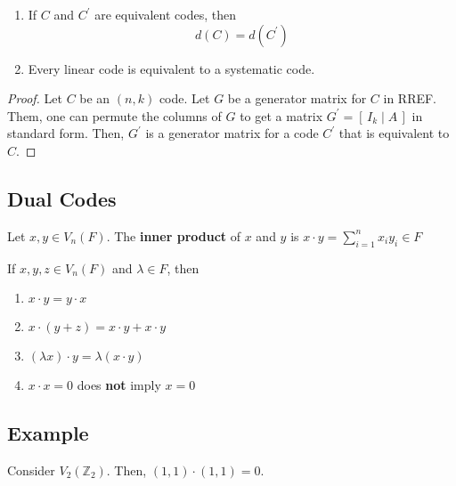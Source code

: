 \begin{thmbox}
    \begin{theorem}
    \begin{enumerate}[(1)]
        \item If $ C $ and $ C^{\prime} $ are equivalent codes, then
        \[ d(C)=d(C^{\prime}) \]
        \item Every linear code is equivalent to a systematic code.
    \end{enumerate}
\end{theorem} \end{thmbox}

\begin{proof}
    Let $ C $ be an $ (n,k) $ code. Let $ G $ be a generator matrix for $ C $
    in RREF. Them, one can permute the columns of $ G $ to get a matrix
    $ G^{\prime}=\left[ \,I_k\mid A\, \right] $ in standard form. Then,
    $ G^{\prime} $ is a generator matrix for a code $ C^{\prime} $ that is
    equivalent to $ C $.
\end{proof}

\subsection{Dual Codes}
\begin{defbox}
    \begin{definition}
    Let $ x,y\in V_n(F) $. The \textbf{inner product} of $ x $ and $ y $
    is $ x\cdot y=\sum\limits_{i=1}^{n} x_iy_i\in F $
\end{definition} \end{defbox}

\begin{thmbox}
    \begin{theorem}
    If $ x,y,z\in V_n(F) $ and $ \lambda\in F $, then
    \begin{enumerate}[(1)]
        \item $ x\cdot y=y\cdot x $
        \item $ x\cdot (y+z)=x\cdot y+x\cdot y $
        \item $ (\lambda x)\cdot y=\lambda(x\cdot y) $
        \item $ x\cdot x=0$ does \textbf{not} imply $ x=0 $
    \end{enumerate}
\end{theorem} \end{thmbox}

\begin{exbox}
    \subsection{Example}
    Consider $ V_2(\mathbb{Z}_2) $. Then, $ (1,1)\cdot(1,1)=0 $.
\end{exbox}

